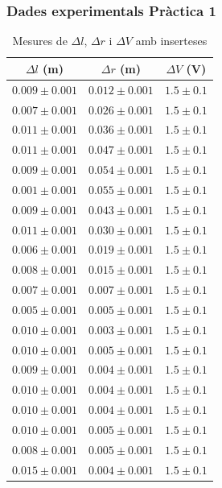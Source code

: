 \documentclass[11pt]{article}
\numberwithin{equation}{section}
\numberwithin{figure}{section}
\numberwithin{table}{section}
\begin{document}
\subsubsection{Dades experimentals Pràctica 1}
\begin{table}[ht]
    \centering
    \caption{Mesures de $\Delta l$, $\Delta r$ i $\Delta V$ amb inserteses}
    \begin{tabular}{ccc}
        \hline
        $\Delta l$ (m) & $\Delta r$ (m) & $\Delta V$ (V) \\
        \hline
        $0.009 \pm 0.001$ & $0.012 \pm 0.001$ & $1.5 \pm 0.1$ \\
        $0.007 \pm 0.001$ & $0.026 \pm 0.001$ & $1.5 \pm 0.1$ \\
        $0.011 \pm 0.001$ & $0.036 \pm 0.001$ & $1.5 \pm 0.1$ \\
        $0.011 \pm 0.001$ & $0.047 \pm 0.001$ & $1.5 \pm 0.1$ \\
        $0.009 \pm 0.001$ & $0.054 \pm 0.001$ & $1.5 \pm 0.1$ \\
        $0.001 \pm 0.001$ & $0.055 \pm 0.001$ & $1.5 \pm 0.1$ \\
        $0.009 \pm 0.001$ & $0.043 \pm 0.001$ & $1.5 \pm 0.1$ \\
        $0.011 \pm 0.001$ & $0.030 \pm 0.001$ & $1.5 \pm 0.1$ \\
        $0.006 \pm 0.001$ & $0.019 \pm 0.001$ & $1.5 \pm 0.1$ \\
        $0.008 \pm 0.001$ & $0.015 \pm 0.001$ & $1.5 \pm 0.1$ \\
        $0.007 \pm 0.001$ & $0.007 \pm 0.001$ & $1.5 \pm 0.1$ \\
        $0.005 \pm 0.001$ & $0.005 \pm 0.001$ & $1.5 \pm 0.1$ \\
        $0.010 \pm 0.001$ & $0.003 \pm 0.001$ & $1.5 \pm 0.1$ \\
        $0.010 \pm 0.001$ & $0.005 \pm 0.001$ & $1.5 \pm 0.1$ \\
        $0.009 \pm 0.001$ & $0.004 \pm 0.001$ & $1.5 \pm 0.1$ \\
        $0.010 \pm 0.001$ & $0.004 \pm 0.001$ & $1.5 \pm 0.1$ \\
        $0.010 \pm 0.001$ & $0.004 \pm 0.001$ & $1.5 \pm 0.1$ \\
        $0.010 \pm 0.001$ & $0.005 \pm 0.001$ & $1.5 \pm 0.1$ \\
        $0.008 \pm 0.001$ & $0.005 \pm 0.001$ & $1.5 \pm 0.1$ \\
        $0.015 \pm 0.001$ & $0.004 \pm 0.001$ & $1.5 \pm 0.1$ \\
        \hline
    \end{tabular}
    
    \label{tab:mesures}
\end{table}
\end{document}
